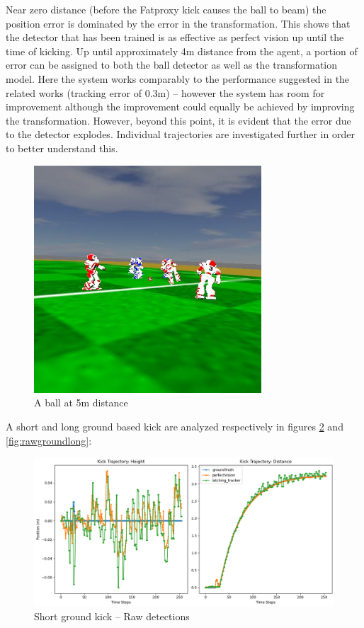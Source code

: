 \documentclass[a4paper,twoside,12pt]{report}
\begin{document}
Near zero distance (before the Fatproxy kick causes the ball to beam) the position error is dominated by the error in the transformation. This shows that the detector that has been trained is as effective as perfect vision up until the time of kicking. Up until approximately 4m distance from the agent, a portion of error can be assigned to both the ball detector as well as the transformation model. Here the system works comparably to the performance suggested in the related works (tracking error of 0.3m) -- however the system has room for improvement although the improvement could equally be achieved by improving the transformation. However, beyond this point, it is evident that the error due to the detector explodes. Individual trajectories are investigated further in order to better understand this.

\begin{figure}[h!]
\begin{center}
\includegraphics[width=8.5cm]{images/5mball.jpeg}
\caption{A ball at 5m distance}
\label{fig:farball}
\end{center}
\end{figure}

A short and long ground based kick are analyzed respectively in figures \ref{fig:rawgroundshort} and \ref{fig:rawgroundlong}:

\begin{figure}[h!]
\begin{center}
\includegraphics[width=14cm]{images/raw_ground_short.png}
\caption{Short ground kick -- Raw detections}
\label{fig:rawgroundshort}
\end{center}
\end{figure}
\end{document}

